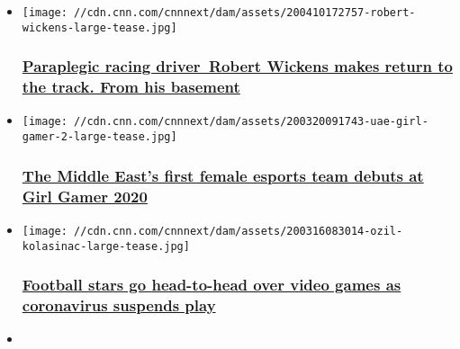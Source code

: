 \begin{itemize}
\item
  \href{/2020/04/13/motorsport/indycar-robert-wickens-coronavirus-spt-intl/index.html}{}

  \texttt{[image: //cdn.cnn.com/cnnnext/dam/assets/200410172757-robert-wickens-large-tease.jpg]}

  \hypertarget{paraplegic-racing-driver-robert-wickens-makes-return-to-the-track-from-his-basement}{%
  \subsubsection{\texorpdfstring{\href{/2020/04/13/motorsport/indycar-robert-wickens-coronavirus-spt-intl/index.html}{Paraplegic
  racing driver~Robert Wickens makes return to the track. From his
  basement}}{Paraplegic racing driver~Robert Wickens makes return to the track. From his basement}}\label{paraplegic-racing-driver-robert-wickens-makes-return-to-the-track-from-his-basement}}
\item
  \href{/2020/03/21/sport/girl-gamers-uae-spc/index.html}{}

  \texttt{[image: //cdn.cnn.com/cnnnext/dam/assets/200320091743-uae-girl-gamer-2-large-tease.jpg]}

  \hypertarget{the-middle-easts-first-female-esports-team-debuts-at-girl-gamer-2020}{%
  \subsubsection{\texorpdfstring{\href{/2020/03/21/sport/girl-gamers-uae-spc/index.html}{The
  Middle East's first female esports team debuts at Girl Gamer
  2020}}{The Middle East's first female esports team debuts at Girl Gamer 2020}}\label{the-middle-easts-first-female-esports-team-debuts-at-girl-gamer-2020}}
\item
  \href{/2020/03/16/sport/esports-football-coronavirus-spt-intl/index.html}{}

  \texttt{[image: //cdn.cnn.com/cnnnext/dam/assets/200316083014-ozil-kolasinac-large-tease.jpg]}

  \hypertarget{football-stars-go-head-to-head-over-video-games-as-coronavirus-suspends-play}{%
  \subsubsection{\texorpdfstring{\href{/2020/03/16/sport/esports-football-coronavirus-spt-intl/index.html}{Football
  stars go head-to-head over video games as coronavirus suspends
  play}}{Football stars go head-to-head over video games as coronavirus suspends play}}\label{football-stars-go-head-to-head-over-video-games-as-coronavirus-suspends-play}}
\item
  \href{/2020/03/02/tech/valorant-league-of-legends-riot-games-shooter/index.html}{}


\end{itemize}
